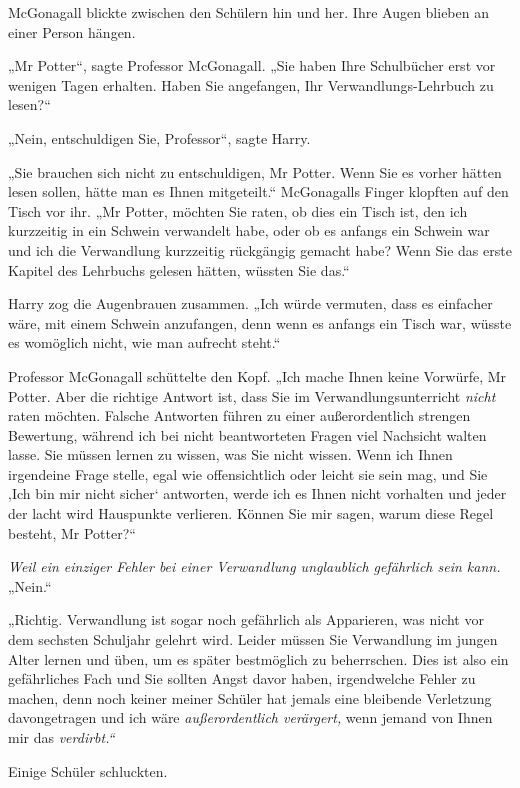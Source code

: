 {McGonagall blickte zwischen den Schülern hin und her. Ihre Augen blieben an einer Person hängen.

„Mr Potter“, sagte Professor McGonagall. „Sie haben Ihre Schulbücher erst vor wenigen Tagen erhalten. Haben Sie angefangen, Ihr Verwandlungs-Lehrbuch zu lesen?“

„Nein, entschuldigen Sie, Professor“, sagte Harry.

„Sie brauchen sich nicht zu entschuldigen, Mr Potter. Wenn Sie es vorher hätten lesen sollen, hätte man es Ihnen mitgeteilt.“ McGonagalls Finger klopften auf den Tisch vor ihr. „Mr Potter, möchten Sie raten, ob dies ein Tisch ist, den ich kurzzeitig in ein Schwein verwandelt habe, oder ob es anfangs ein Schwein war und ich die Verwandlung kurzzeitig rückgängig gemacht habe? Wenn Sie das erste Kapitel des Lehrbuchs gelesen hätten, wüssten Sie das.“

Harry zog die Augenbrauen zusammen. „Ich würde vermuten, dass es einfacher wäre, mit einem Schwein anzufangen, denn wenn es anfangs ein Tisch war, wüsste es womöglich nicht, wie man aufrecht steht.“

Professor McGonagall schüttelte den Kopf. „Ich mache Ihnen keine Vorwürfe, Mr Potter. Aber die richtige Antwort ist, dass Sie im Verwandlungsunterricht \emph{nicht} raten möchten. Falsche Antworten führen zu einer außerordentlich strengen Bewertung, während ich bei nicht beantworteten Fragen viel Nachsicht walten lasse. Sie müssen lernen zu wissen, was Sie nicht wissen. Wenn ich Ihnen irgendeine Frage stelle, egal wie offensichtlich oder leicht sie sein mag, und Sie ‚Ich bin mir nicht sicher` antworten, werde ich es Ihnen nicht vorhalten und jeder der lacht wird Hauspunkte verlieren. Können Sie mir sagen, warum diese Regel besteht, Mr Potter?“

\emph{Weil ein einziger Fehler bei einer Verwandlung unglaublich gefährlich sein kann.}\\ „Nein.“

„Richtig. Verwandlung ist sogar noch gefährlich als Apparieren, was nicht vor dem sechsten Schuljahr gelehrt wird. Leider müssen Sie Verwandlung im jungen Alter lernen und üben, um es später bestmöglich zu beherrschen. Dies ist also ein gefährliches Fach und Sie sollten Angst davor haben, irgendwelche Fehler zu machen, denn noch keiner meiner Schüler hat jemals eine bleibende Verletzung davongetragen und ich wäre \emph{außerordentlich verärgert,} wenn jemand von Ihnen mir das \emph{verdirbt.“}

Einige Schüler schluckten.

}
